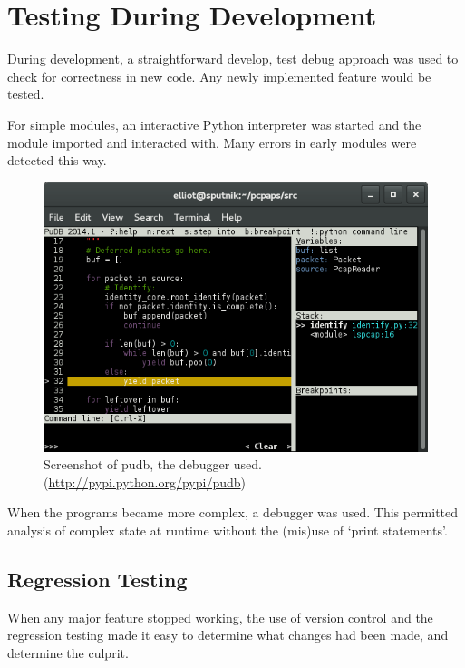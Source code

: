 \documentclass[10pt,a4paper,notitlepage,twoside]{report}
\begin{document}
\section{Testing During Development}
During development, a straightforward develop, test debug approach was used to check for correctness in new code. Any newly implemented feature would be tested.

For simple modules, an interactive Python interpreter was started and the module imported and interacted with. Many errors in early modules were detected this way.

\begin{figure}[H]
\center
\includegraphics[scale=0.75]{pictures/pudb.png}
\caption{Screenshot of pudb, the debugger used. (\url{http://pypi.python.org/pypi/pudb})}
\end{figure}

When the programs became more complex, a debugger was used. This permitted analysis of complex state at runtime without the (mis)use of `print statements'.

\subsection{Regression Testing}
When any major feature stopped working, the use of version control and the regression testing made it easy to determine what changes had been made, and determine the culprit.
\end{document}
